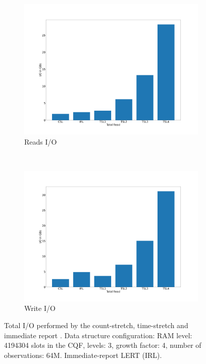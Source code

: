 \begin{figure}
{\centering
\begin{subfigure}{.50\textwidth}
  \centering
  \includegraphics[width=\linewidth]{../LERT-src/sigmod20_figs/io_read.png}
  \captionsetup{margin=.5cm}
 \caption{Reads I/O}
\end{subfigure}
\\
\begin{subfigure}{.50\textwidth}
  \centering
  \includegraphics[width=\linewidth]{../LERT-src/sigmod20_figs/io_write.png}
  \captionsetup{margin=.5cm}
 \caption{Write I/O}
\end{subfigure}
}
\label{fig:io-data}
\caption{Total
  I/O performed by the count-stretch, time-stretch and immediate report \LERT. Data structure configuration: RAM
  level: 4194304 slots in the CQF, levels: 3, growth factor: 4, number of
  observations: 64M. Immediate-report LERT (IRL).}
\end{figure}

